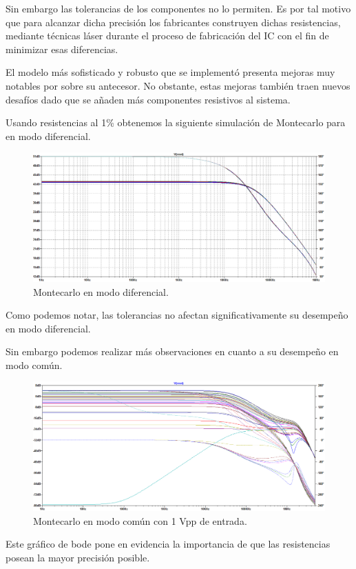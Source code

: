 Sin embargo las tolerancias de los componentes no lo permiten. Es por tal motivo que para alcanzar dicha precisión los fabricantes construyen dichas resistencias, mediante técnicas láser durante el proceso de fabricación del IC con el fin de minimizar esas diferencias.

El modelo más sofisticado y robusto que se implementó presenta mejoras muy notables por sobre su antecesor. No obstante, estas mejoras también traen nuevos desafíos dado que se añaden más componentes resistivos al sistema.

Usando resistencias al 1\% obtenemos la siguiente simulación de Montecarlo para en modo diferencial.

\begin{figure}[H]
	\centering
	\includegraphics[width=\textwidth]{./ImagenesDeSimulaciones/MonteCarloModoDiferencialGrande.png}
	\caption{Montecarlo en modo diferencial.}
\end{figure}  
Como podemos notar, las tolerancias no afectan significativamente su desempeño en modo diferencial.

Sin embargo podemos realizar más observaciones en cuanto a su desempeño en modo común.
\begin{figure}[H]
	\centering
	\includegraphics[height=0.3\textheight]{./ImagenesDeSimulaciones/MonteCarloModoComunGrande1V.png}
	\caption{Montecarlo en modo común con 1 Vpp de entrada.}
\end{figure} 
Este gráfico de bode pone en evidencia la importancia de que las resistencias posean la mayor precisión posible.

